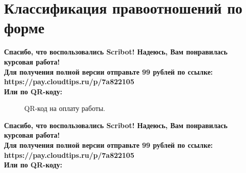 \documentclass{article}
\begin{document}
\section{Классификация правоотношений по форме}
\begin{center}
    \textbf{
        Спасибо, что воспользовались Scribot! Надеюсь, Вам понравилась курсовая работа!\\
        Для получения полной версии отправьте 99 рублей по ссылке:\\
        https://pay.cloudtips.ru/p/7a822105\\
        Или по QR-коду:\\
    }
\end{center}
\begin{figure}[h]
    \caption{QR-код на оплату работы.}
    \label{ris:image}
\end{figure}
\newpage
\begin{center}
    \textbf{
        Спасибо, что воспользовались Scribot! Надеюсь, Вам понравилась курсовая работа!\\
        Для получения полной версии отправьте 99 рублей по ссылке:\\
        https://pay.cloudtips.ru/p/7a822105\\
        Или по QR-коду:\\
    }
\end{center}
\end{document}
